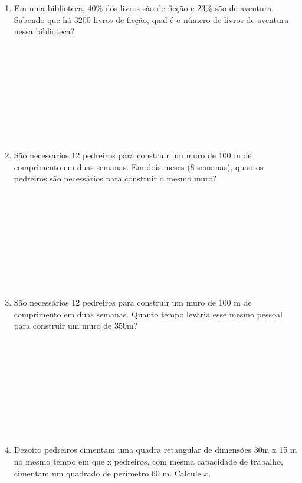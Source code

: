 \documentclass[a4paper,14pt]{article}
\begin{document}
\begin{multicols}{2}
\begin{enumerate}
	    	\item Em uma biblioteca, 40\% dos livros são de ficção e 23\% são de aventura. Sabendo que há 3200 livros de ficção, qual é o número de livros de aventura nessa biblioteca? \\\\\\\\\\\\\\\\\\\\
	    	\item São necessários 12 pedreiros para construir um muro de 100 m de comprimento em duas semanas. Em dois meses (8 semanas), quantos pedreiros são necessários para construir o mesmo muro? \\\\\\\\\\\\\\\\\\\\
	    	\item São necessários 12 pedreiros para construir um muro de 100 m de comprimento em duas semanas. Quanto tempo levaria esse mesmo pessoal para construir um muro de 350m? \\\\\\\\\\\\\\\\\\\\
	    	\item Dezoito pedreiros cimentam uma quadra retangular de dimensões 30m x 15 m no mesmo tempo em que x pedreiros, com mesma capacidade de trabalho, cimentam um quadrado de perímetro 60 m. Calcule $x$. \\\\\\\\\\\\\\\\\\\\

\end{enumerate}
\end{multicols}
\end{document}
